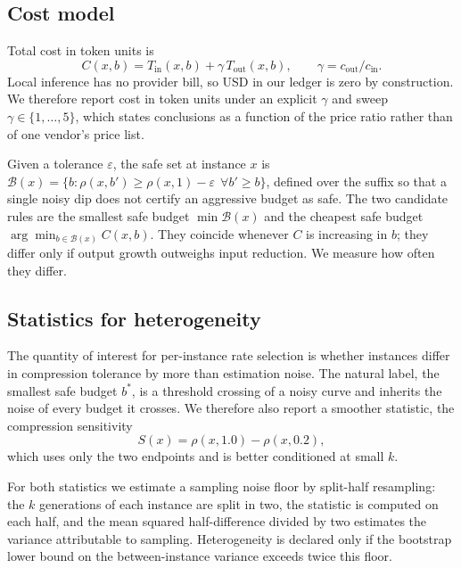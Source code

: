 \documentclass[conference]{IEEEtran}
\begin{document}
\subsection{Cost model}

Total cost in token units is
\begin{equation}
C(x,b) = T_{\mathrm{in}}(x,b) + \gamma \, T_{\mathrm{out}}(x,b),
\qquad \gamma = c_{\mathrm{out}}/c_{\mathrm{in}}.
\label{eq:cost}
\end{equation}
Local inference has no provider bill, so USD in our ledger is zero by
construction. We therefore report cost in token units under an explicit
$\gamma$ and sweep $\gamma \in \{1,\dots,5\}$, which states conclusions as a
function of the price ratio rather than of one vendor's price list.

Given a tolerance $\varepsilon$, the safe set at instance $x$ is
$\mathcal{B}(x) = \{b : \rho(x,b') \geq \rho(x,1) - \varepsilon \ \ \forall b'
\geq b\}$, defined over the suffix so that a single noisy dip does not
certify an aggressive budget as safe. The two candidate rules are the smallest
safe budget $\min \mathcal{B}(x)$ and the cheapest safe budget $\arg\min_{b
\in \mathcal{B}(x)} C(x,b)$. They coincide whenever $C$ is increasing in $b$;
they differ only if output growth outweighs input reduction. We measure how
often they differ.

\subsection{Statistics for heterogeneity}
\label{sec:power}

The quantity of interest for per-instance rate selection is whether instances
differ in compression tolerance by more than estimation noise. The natural
label, the smallest safe budget $b^{*}$, is a threshold crossing of a noisy
curve and inherits the noise of every budget it crosses. We therefore also
report a smoother statistic, the compression sensitivity
\begin{equation}
S(x) = \rho(x,1.0) - \rho(x,0.2),
\end{equation}
which uses only the two endpoints and is better conditioned at small $k$.

For both statistics we estimate a sampling noise floor by split-half
resampling: the $k$ generations of each instance are split in two, the
statistic is computed on each half, and the mean squared half-difference
divided by two estimates the variance attributable to sampling. Heterogeneity
is declared only if the bootstrap lower bound on the between-instance variance
exceeds twice this floor.
\end{document}
